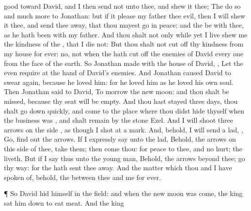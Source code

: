 {good toward
David, and I then
send not unto thee, and
shew it thee;
The
{}
do
so and much
more to
Jonathan: but if it
please my
father
{} thee
evil, then I will
shew it thee, and send thee
away, that thou mayest
go in
peace: and the
{} be with thee, as he hath been with my
father.
And thou shalt not only while
yet I
live
shew me the
kindness of the
{}, that I
die not:
But
{} thou shalt not cut
off thy
kindness from my
house
for
ever: no, not when the
{} hath cut
off the
enemies of
David every
one from the
face of the
earth.
So
Jonathan
made
{} with the
house of
David,
{}, Let the
{} even
require
{} at the
hand of
David’s
enemies.
And
Jonathan caused
David to
swear
again, because he
loved him: for he
loved him as he
loved his own
soul.
Then
Jonathan
said to
David, To
morrow
{} the new
moon: and thou shalt be
missed, because thy
seat will be
empty.
And
{} thou hast stayed three
days,
{} thou shalt go
down
quickly, and
come to the
place where thou didst
hide thyself
when the
business was
{}, and shalt
remain
by the
stone
Ezel.
And I will
shoot
three
arrows on the
side
{}, as though I
shot at a
mark.
And, behold, I will
send a
lad,
{},
Go, find
out the
arrows. If I
expressly
say unto the
lad, Behold, the
arrows
{} on this side of thee,
take them; then
come thou: for
{}
peace to thee, and no
hurt;
{} the
{}
liveth.
But if I
say thus unto the young
man, Behold, the
arrows
{}
beyond thee; go thy
way: for the
{} hath sent thee
away.
And
{} the
matter which thou and I have
spoken of, behold, the
{}
{} between thee and me
for
ever.
\par }{\PP {}¶ So
David
hid himself in the
field: and when the new
moon was come, the
king sat him
down to
eat
meat.
And the
king
}
